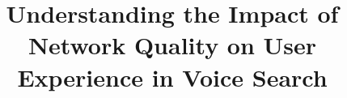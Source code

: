 \documentclass{sig-alternate}
\begin{document}
\title{Understanding the Impact of Network Quality on User Experience in Voice Search}
\author{}

\maketitle



% 
% 



\end{document}
